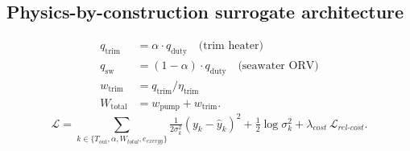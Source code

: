 \documentclass[11pt]{article}
\begin{document}
\subsection{Physics-by-construction surrogate architecture}
\label{sec:pinn}
%
%
\begin{align}
  q_{\text{trim}} &= \alpha \cdot q_{\text{duty}} \quad\text{(trim heater)} \\
  q_{\text{sw}}   &= (1 - \alpha) \cdot q_{\text{duty}} \quad\text{(seawater ORV)} \\
  w_{\text{trim}} &= q_{\text{trim}} / \eta_{\text{trim}} \\
  W_{\text{total}} &= w_{\text{pump}} + w_{\text{trim}}.
\end{align}
\begin{equation}
  \mathcal{L} = \sum_{k \in \{T_{out}, \alpha, W_{total}, e_{exergy}\}}
    \tfrac{1}{2 \sigma_k^2} (y_k - \hat y_k)^2 + \tfrac{1}{2} \log \sigma_k^2
    + \lambda_{cost} \, \mathcal{L}_{rel\text{-}cost}.
\end{equation}
%
\end{document}
